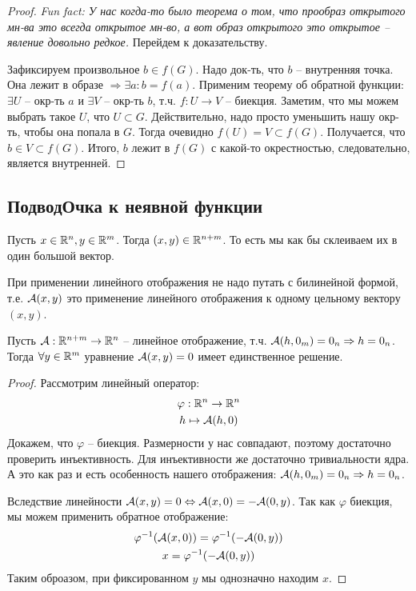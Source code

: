 \begin{proof}
    \textit{Fun fact: У нас когда-то было теорема о том, что прообраз открытого мн-ва это всегда открытое мн-во,
    а вот образ открытого это открытое -- явление довольно редкое.} 
    Перейдем к доказательству.

    \quad Зафиксируем произвольное $b \in f(G)$. 
    Надо док-ть, что $b$ -- внутренняя точка. 
    Она лежит в образе $\Rightarrow \exists a : b = f(a)$.
    Применим теорему об обратной функции: $\exists U$ -- окр-ть $a$ и $\exists V$ -- окр-ть $b$, т.ч. $f: U \to V$ -- биекция.
    Заметим, что мы можем выбрать такое $U$, что $U \subset G$. 
    Действительно, надо просто уменьшить нашу окр-ть, чтобы она попала в $G$. 
    Тогда очевидно $f(U) = V \subset f(G)$.
    Получается, что $b \in V \subset f(G)$. 
    Итого, $b$ лежит в $f(G)$ с какой-то окрестностью, следовательно, является внутренней.
\end{proof}

\subsection{ПодводОчка к неявной функции}
\begin{conj}
    Пусть $x \in \mathbb{R}^n, y \in \mathbb{R}^m$. 
    Тогда $(x, y) \in \mathbb{R}^{n + m}$.  
    То есть мы как бы склеиваем их в один большой вектор.
\end{conj}

\begin{notice}
    При применении линейного отображения не надо путать с билинейной формой, т.е. $\mathcal{A}(x, y)$ это применение линейного отображения к одному цельному вектору $(x, y)$.
\end{notice}

\begin{lemma}
    Пусть $\mathcal{A} : \mathbb{R}^{n + m} \to \mathbb{R}^n$ -- линейное отображение, т.ч. $\mathcal{A}(h, 0_m) = 0_n \Rightarrow h = 0_n$.
    \\ Тогда $\forall y \in \mathbb{R}^m$ уравнение $\mathcal{A}(x, y) = 0$ имеет единственное решение.
\end{lemma}
\begin{proof}
    Рассмотрим линейный оператор: \begin{gather*}
        \varphi: \mathbb{R}^n \to \mathbb{R}^n \\
        h \mapsto \mathcal{A}(h, 0)
    \end{gather*}
    \quad Докажем, что $\varphi$ -- биекция.
    Размерности у нас совпадают, поэтому достаточно проверить инъективность.
    Для инъективности же достаточно тривиальности ядра. 
    А это как раз и есть особенность нашего отображения: $\mathcal{A}(h, 0_m) = 0_n \Rightarrow h = 0_n$.

    \quad Вследствие линейности $\mathcal{A}(x, y) = 0 \Leftrightarrow \mathcal{A}(x, 0) = -\mathcal{A}(0, y)$.
    Так как $\varphi$ биекция, мы можем применить обратное отображение:
    \begin{gather*} 
        \varphi^{-1}(\mathcal{A}(x, 0)) = \varphi^{-1}(-\mathcal{A}(0, y)) \\
        x = \varphi^{-1}(-\mathcal{A}(0, y))
    \end{gather*}
    \quad Таким оброазом, при фиксированном $y$ мы однозначно находим $x$. 
\end{proof}

